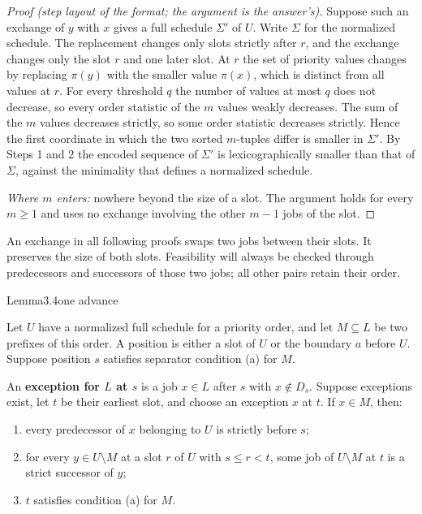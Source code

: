 \begin{proof}[Proof (step layout of the format; the argument is the answer's)]
Suppose such an exchange of $y$ with $x$ gives a full schedule $\Sigma'$ of $U$. Write $\Sigma$ for the normalized
schedule.
 The replacement changes only slots strictly after $r$, and the
exchange changes only the slot $r$ and one later slot. 
 At $r$ the set of priority values changes by
replacing $\pi(y)$ with the smaller value $\pi(x)$, which is distinct from all values at $r$. For every threshold $q$
the number of values at most $q$ does not decrease, so every order statistic of the $m$ values weakly decreases. The
sum of the $m$ values decreases strictly, so some order statistic decreases strictly. Hence the first coordinate in
which the two sorted $m$-tuples differ is smaller in $\Sigma'$. 
 By Steps 1 and 2 the encoded sequence of $\Sigma'$ is lexicographically smaller than that of
$\Sigma$, against the minimality that defines a normalized schedule. 

\noindent\emph{Where $m$ enters:} nowhere beyond the size of a slot. The argument holds for every $m\geq 1$ and uses
no exchange involving the other $m-1$ jobs of the slot.
\end{proof}

An exchange in all following proofs swaps two jobs between their slots. It preserves the size of both slots. Feasibility will always be checked through predecessors and successors of those two jobs; all other pairs retain their order.

\begin{numbered}{Lemma}{3.4}{one advance}

Let \(U\) have a normalized full schedule for a priority order, and let \(M\subseteq L\) be two prefixes of this order. A position is either a slot of \(U\) or the boundary \(a\) before \(U\). Suppose position \(s\) satisfies separator condition (a) for \(M\).

An \textbf{exception for \(L\) at \(s\)} is a job \(x\in L\) after \(s\) with \(x\notin D_s\). Suppose exceptions exist, let \(t\) be their earliest slot, and choose an exception \(x\) at \(t\). If \(x\in M\), then:

\begin{enumerate}
\def\labelenumi{\arabic{enumi}.}
\tightlist
\item
  every predecessor of \(x\) belonging to \(U\) is strictly before \(s\);
\item
  for every \(y\in U\setminus M\) at a slot \(r\) of \(U\) with \(s\leq r<t\), some job of \(U\setminus M\) at \(t\) is a strict successor of \(y\);
\item
  \(t\) satisfies condition (a) for \(M\).
\end{enumerate}

\end{numbered}

